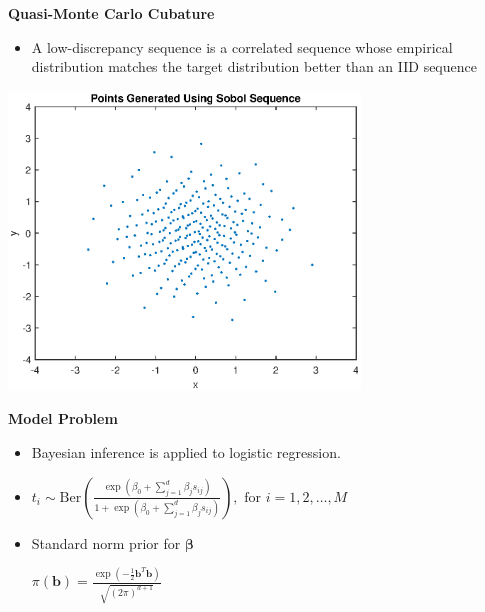 \documentclass[final,mathserif]{beamer}
\newcommand{\blue}[1]{{\color{myblue}#1}}
\renewcommand{\blue}{\textcolor{blue!80!black}}
\begin{document}
\begin{frame}[fragile]
\begin{columns}[t]
\begin{column}{.31\linewidth}
\begin{block} {\Large \textbf{\blue {Quasi-Monte Carlo Cubature}}}
\begin{itemize}
where $\left\{x_i\right\}_{i=1}^\infty$ is a low-discrepancy sequence

\item A \alert{low-discrepancy sequence} is a \alert{correlated} sequence whose empirical distribution matches the target distribution better than an IID sequence

\end{itemize}
\begin{center}
\includegraphics[width=0.7\textwidth]{SobolPoints}
\end{center}
\end{block}

\vspace{.1in}

\begin{block}{\Large \textbf{\blue {Model Problem}}}
\vspace{.1in}
\begin{itemize}
\item Bayesian inference is applied to logistic regression.

\vspace{.15in}

\item $t_i \sim \text{Ber} \left(\frac{\exp{\left(\beta_0+\sum_{j=1}^d\beta_j s_{ij}\right)}} {1+\exp \left({{\beta_0+\sum_{j=1}^d\beta_js_{ij}}}\right)}\right), \text{ for } i=1, 2, \dots , M$

\vspace{.15in}

\item Standard norm prior for $\boldsymbol{\beta}$

\vspace{.15in}

$\pi(\boldsymbol{b})=\frac{\exp{\left({-\frac{1}{2}\boldsymbol{b}^T\boldsymbol{b}}\right )}}{\sqrt{(2\pi)^{d+1}}}$


\end{itemize}
\end{block}
\end{column}
\end{columns}
\end{frame}
\end{document}
